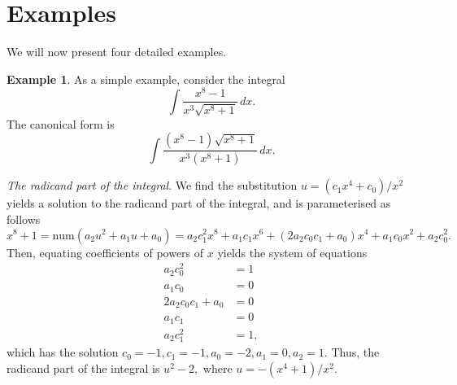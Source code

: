 \documentclass[12pt]{article}
\numberwithin{equation}{section}
\theoremstyle{definition}
\newtheorem{example}{Example}[section]
\begin{document}
\section{Examples}
We will now present four detailed examples. 
\fi
\iffalse
\begin{example}
As a simple example, consider the integral $$\int \frac{x^8-1}{x^3 \sqrt{x^8+1}} \, dx.$$ The 
canonical form is $$\int \frac{\left(x^8-1\right)\sqrt{x^8+1}}{x^3\left(x^8+1\right)}\, dx.$$ 

\noindent\textit{The radicand part of the integral}. We find the substitution 
$u=\left(c_1 x^4+c_0\right)/x^2$ yields a solution to the radicand part of 
the integral, and is parameterised as follows
$$x^8+1 = \text{num}\left( a_2u^2 + a_1u + a_0 \right) = 
a_2 c_1^2 x^8 + a_1 c_1 x^6 + \left(2 a_2 c_0 c_1+a_0\right)x^4 + a_1 c_0 x^2 + a_2 c_0^2.$$
Then, equating coefficients of powers of $x$ yields the system of equations
\begin{align*}
 a_2 c_0^2&=1 \\
 a_1 c_0&=0 \\
 2 a_2 c_0 c_1+a_0&=0 \\
 a_1 c_1&=0 \\
 a_2 c_1^2&=1,
\end{align*}
which has the solution $c_0=-1,c_1=-1,a_0=-2,a_1=0,a_2=1$. Thus, the radicand part of the integral is 
$u^2-2,$ where $u=-\left(x^4+1\right)/x^2$. \\


\end{example}
\end{document}
